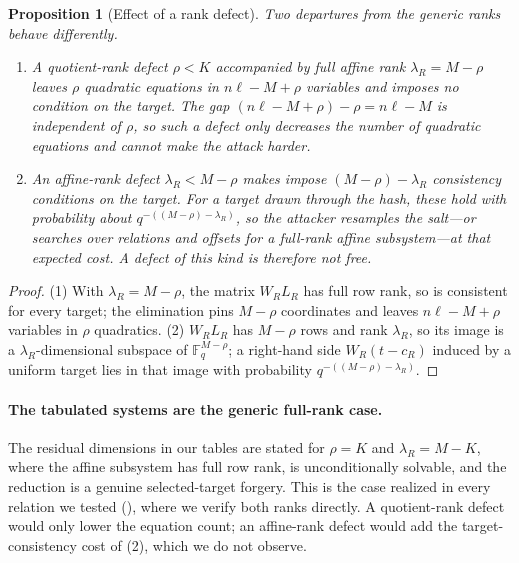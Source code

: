 \documentclass[11pt]{article}
\newtheorem{proposition}[theorem]{Proposition}
\newcommand{\F}{\mathbb F}
\begin{document}
\begin{proposition}[Effect of a rank defect]
\label{prop:affine-rank}
Two departures from the generic ranks behave differently.
\begin{enumerate}
\item A \emph{quotient-rank} defect $\rho<K$ accompanied by full affine rank $\lambda_R=M-\rho$ leaves $\rho$ quadratic equations in $n\ell-M+\rho$ variables and imposes no condition on the target.  The gap $(n\ell-M+\rho)-\rho=n\ell-M$ is independent of $\rho$, so such a defect only decreases the number of quadratic equations and cannot make the attack harder.
\item An \emph{affine-rank} defect $\lambda_R<M-\rho$ makes  impose $(M-\rho)-\lambda_R$ consistency conditions on the target.  For a target drawn through the hash, these hold with probability about $q^{-((M-\rho)-\lambda_R)}$, so the attacker resamples the salt---or searches over relations and offsets for a full-rank affine subsystem---at that expected cost.  A defect of this kind is therefore \emph{not} free.
\end{enumerate}
\end{proposition}

\begin{proof}
(1) With $\lambda_R=M-\rho$, the matrix $W_RL_R$ has full row rank, so  is consistent for every target; the elimination pins $M-\rho$ coordinates and leaves $n\ell-M+\rho$ variables in $\rho$ quadratics.  (2) $W_RL_R$ has $M-\rho$ rows and rank $\lambda_R$, so its image is a $\lambda_R$-dimensional subspace of $\F_q^{M-\rho}$; a right-hand side $W_R(t-c_R)$ induced by a uniform target lies in that image with probability $q^{-((M-\rho)-\lambda_R)}$.
\end{proof}

\paragraph{The tabulated systems are the generic full-rank case.}
The residual dimensions in our tables are stated for $\rho=K$ and $\lambda_R=M-K$, where the affine subsystem has full row rank,  is unconditionally solvable, and the reduction is a genuine selected-target forgery.  This is the case realized in every relation we tested (), where we verify both ranks directly.  A quotient-rank defect would only lower the equation count; an affine-rank defect would add the target-consistency cost of (2), which we do not observe.
\end{document}
